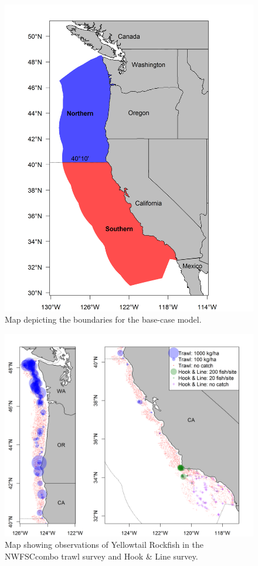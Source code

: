 \documentclass[12pt,]{article}
\begin{document}
\begin{figure}[htbp]
\centering
\includegraphics{Figures/assess_region_map_v2.png}
\caption{Map depicting the boundaries for the base-case model.
\label{fig:assess_region_map}}
\end{figure}

\begin{figure}[htbp]
\centering
\includegraphics{Figures/survey_hauls_map.png}
\caption{Map showing observations of Yellowtail Rockfish in the
NWFSCcombo trawl survey and Hook \& Line survey.
\label{fig:assess_region_map}}
\end{figure}
\end{document}
